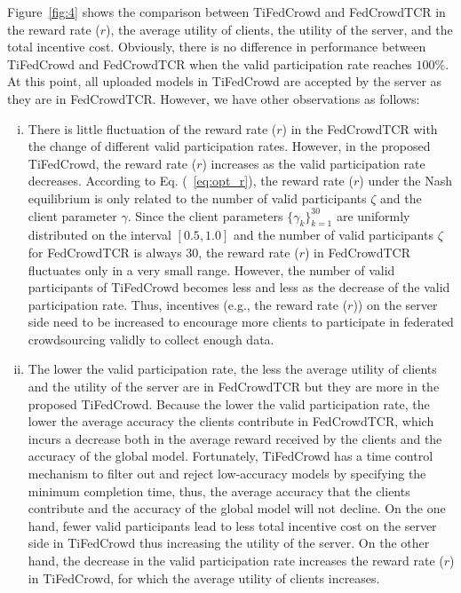 \documentclass[final,1p,times]{elsarticle}
\begin{document}
Figure~\ref{fig:4} shows the comparison between TiFedCrowd and FedCrowdTCR in the reward rate ($r$), the average utility of clients, the utility of the server, and the total incentive cost. Obviously, there is no difference in performance between TiFedCrowd and FedCrowdTCR when the valid participation rate reaches $100\%$. At this point, all uploaded models in TiFedCrowd are accepted by the server as they are in FedCrowdTCR. However, we have other observations as follows:

\begin{enumerate}[(i)]
	\item There is little fluctuation of the reward rate ($r$) in the FedCrowdTCR with the change of different valid participation rates. However, in the proposed TiFedCrowd, the reward rate ($r$) increases as the valid participation rate decreases. According to Eq. (~\ref{eq:opt_r}), the reward rate ($r$) under the Nash equilibrium is only related to the number of valid participants $\zeta$ and the client parameter $\gamma$. Since the client parameters $\{\gamma_k\}_{k=1}^{30}$ are uniformly distributed on the interval $[0.5, 1.0]$ and the number of valid participants $\zeta$ for FedCrowdTCR is always $30$, the reward rate ($r$) in FedCrowdTCR fluctuates only in a very small range. However, the number of valid participants of TiFedCrowd becomes less and less as the decrease of the valid participation rate. Thus, incentives (e.g., the reward rate ($r$)) on the server side need to be increased to encourage more clients to participate in federated crowdsourcing validly to collect enough data.
	\item The lower the valid participation rate, the less the average utility of clients and the utility of the server are in FedCrowdTCR but they are more in the proposed TiFedCrowd. Because the lower the valid participation rate, the lower the average accuracy the clients contribute in FedCrowdTCR, which incurs a decrease both in the average reward received by the clients and the accuracy of the global model. Fortunately, TiFedCrowd has a time control mechanism to filter out and reject low-accuracy models by specifying the minimum completion time, thus, the average accuracy that the clients contribute and the accuracy of the global model will not decline. On the one hand, fewer valid participants lead to less total incentive cost on the server side in TiFedCrowd thus increasing the utility of the server. On the other hand, the decrease in the valid participation rate increases the reward rate ($r$) in TiFedCrowd, for which the average utility of clients increases.

\end{enumerate}
\end{document}
